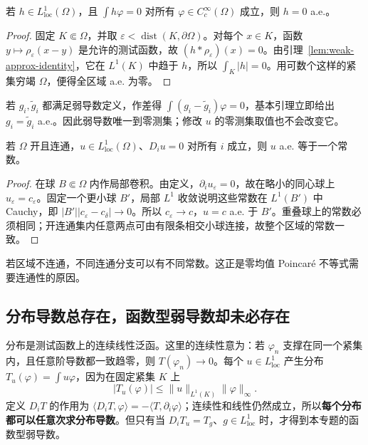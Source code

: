 \begin{lemma}[局部可积函数的基本引理]\label{lem:weak-fundamental}
若 $h\in L^1_{\mathrm{loc}}(\Omega)$，且 $\int h\varphi=0$ 对所有 $\varphi\in C_c^\infty(\Omega)$ 成立，则 $h=0$ a.e.。
\end{lemma}
\begin{proof}
固定 $K\Subset\Omega$，并取 $\varepsilon<\operatorname{dist}(K,\partial\Omega)$。对每个 $x\in K$，函数 $y\mapsto\rho_\varepsilon(x-y)$ 是允许的测试函数，故 $(h*\rho_\varepsilon)(x)=0$。由引理~\ref{lem:weak-approx-identity}，它在 $L^1(K)$ 中趋于 $h$，所以 $\int_K|h|=0$。用可数个这样的紧集穷竭 $\Omega$，便得全区域 a.e. 为零。
\end{proof}

若 $g_i,\widetilde g_i$ 都满足弱导数定义，作差得 $\int(g_i-\widetilde g_i)\varphi=0$，基本引理立即给出 $g_i=\widetilde g_i$ a.e.。因此弱导数唯一到零测集；修改 $u$ 的零测集取值也不会改变它。

\begin{proposition}[连通区域上零弱梯度意味着常数]\label{prop:weak-zero-gradient}
若 $\Omega$ 开且连通，$u\in L^1_{\mathrm{loc}}(\Omega)$、$D_i u=0$ 对所有 $i$ 成立，则 $u$ a.e. 等于一个常数。
\end{proposition}
\begin{proof}
在球 $B\Subset\Omega$ 内作局部卷积。由定义，$\partial_i u_\varepsilon=0$，故在略小的同心球上 $u_\varepsilon=c_\varepsilon$。固定一个更小球 $B'$，局部 $L^1$ 收敛说明这些常数在 $L^1(B')$ 中 Cauchy，即
$|B'||c_\varepsilon-c_\delta|\to0$。所以 $c_\varepsilon\to c$，$u=c$ a.e. 于 $B'$。重叠球上的常数必须相同；开连通集内任意两点可由有限条相交小球连接，故整个区域的常数一致。
\end{proof}
若区域不连通，不同连通分支可以有不同常数。这正是零均值 Poincar\'e 不等式需要连通性的原因。

\subsection{分布导数总存在，函数型弱导数却未必存在}

分布是测试函数上的连续线性泛函。这里的连续性意为：若 $\varphi_n$ 支撑在同一个紧集内，且任意阶导数都一致趋零，则 $T(\varphi_n)\to0$。每个 $u\in L^1_{\mathrm{loc}}$ 产生分布 $T_u(\varphi)=\int u\varphi$，因为在固定紧集 $K$ 上
\[
 |T_u(\varphi)|\le\|u\|_{L^1(K)}\|\varphi\|_\infty.
\]
定义 $D_iT$ 的作用为 $\langle D_iT,\varphi\rangle=-\langle T,\partial_i\varphi\rangle$；连续性和线性仍然成立，所以\textbf{每个分布都可以任意次求分布导数}。但只有当 $D_iT_u=T_g$、$g\in L^1_{\mathrm{loc}}$ 时，才得到本专题的函数型弱导数。

